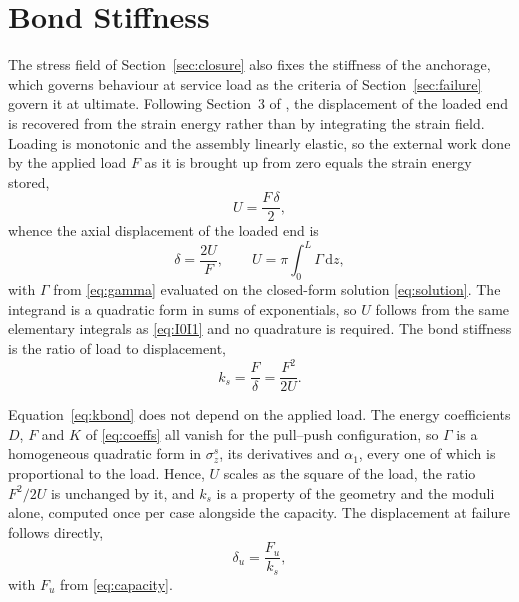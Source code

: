 \section{Bond Stiffness}
\label{sec:stiffness}
 
\begingroup
\setlength{\abovedisplayskip}{13pt plus 3pt minus 1pt}
\setlength{\belowdisplayskip}{13pt plus 3pt minus 1pt}
\setlength{\abovedisplayshortskip}{8pt plus 2pt minus 1pt}
\setlength{\belowdisplayshortskip}{8pt plus 2pt minus 1pt}
 
The stress field of Section~\ref{sec:closure} also fixes the stiffness of the
anchorage, which governs behaviour at service load as the criteria of
Section~\ref{sec:failure} govern it at ultimate. Following Section~3 of
\textcite{alaviAnalyticalProcedureFailure2025}, the displacement of the loaded
end is recovered from the strain energy rather than by integrating the strain
field. Loading is monotonic and the assembly linearly elastic, so the external
work done by the applied load $F$ as it is brought up from zero equals the
strain energy stored,
\begin{equation}
\label{eq:work}
U = \frac{F\,\delta}{2} ,
\end{equation}
whence the axial displacement of the loaded end is
\begin{equation}
\label{eq:slip}
\delta = \frac{2U}{F} ,
\qquad
U = \pi \int_0^L \Gamma \,\mathrm{d}z ,
\end{equation}
with $\Gamma$ from \eqref{eq:gamma} evaluated on the closed-form solution
\eqref{eq:solution}. The integrand is a quadratic form in sums of
exponentials, so $U$ follows from the same elementary integrals as
\eqref{eq:I0I1} and no quadrature is required. 
The bond stiffness is
the ratio of load to displacement, 
\begin{equation}
\label{eq:kbond}
k_s = \frac{F}{\delta} = \frac{F^2}{2U} .
\end{equation}
 
Equation~\eqref{eq:kbond} does not depend on the applied load. The energy
coefficients $D$, $F$ and $K$ of \eqref{eq:coeffs} all vanish for the
pull--push configuration, so $\Gamma$ is a homogeneous quadratic form in
$\sigma_z^{s}$, its derivatives and $\alpha_1$, every one of which is
proportional to the load. Hence, $U$ scales as the square of the load, the
ratio $F^2/2U$ is unchanged by it, and $k_s$ is a property of the geometry and
the moduli alone, computed once per case alongside the capacity. The
displacement at failure follows directly,
\begin{equation}
\label{eq:slipfail}
\delta_u = \frac{F_u}{k_s} ,
\end{equation}
with $F_u$ from \eqref{eq:capacity}.
 
